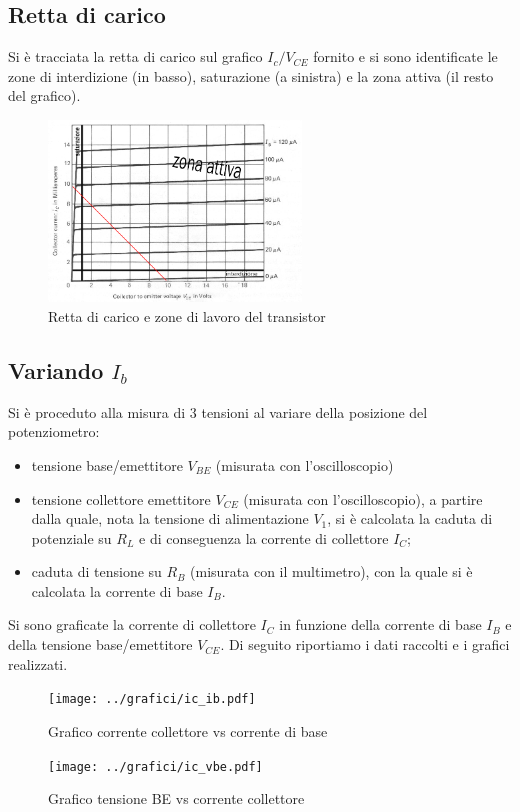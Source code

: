 \documentclass[10pt,a4paper]{article}
\begin{document}
\subsection{Retta di carico}
Si è tracciata la retta di carico sul grafico $I_c/V_{CE}$ fornito e si sono identificate le zone di interdizione (in basso), saturazione (a sinistra) e la zona attiva (il resto del grafico).
\begin{figure}[h]
	\centering
	\includegraphics[width=0.6\textwidth]{../grafici/retta_carico.png}
	\caption{Retta di carico e zone di lavoro del transistor}
	\label{retta_carico}
\end{figure}
\subsection{Variando $I_b$} %
Si è proceduto alla misura di 3 tensioni al variare della posizione del potenziometro:
\begin{itemize}
	\item tensione base/emettitore $V_{BE}$ (misurata con l'oscilloscopio)
	\item tensione collettore emettitore $V_{CE}$ (misurata con l'oscilloscopio), a partire dalla quale, nota la tensione di alimentazione $V_1$, si è calcolata la caduta di potenziale su $R_L$ e di conseguenza la corrente di collettore $I_C$;
	\item caduta di tensione su $R_B$ (misurata con il multimetro), con la quale si è calcolata la corrente di base $I_B$.
\end{itemize}
Si sono graficate la corrente di collettore $I_C$ in funzione della corrente di base $I_B$ e della tensione base/emettitore $V_{CE}$.
Di seguito riportiamo i dati raccolti e i grafici realizzati.

\begin{figure}[h!]
	\centering
	\begin{minipage}[h!]{0.4\textwidth}
		\centering
		\resizebox{1\textwidth}{!}{
			}
	\end{minipage}
	\begin{minipage}[d]{0.59\textwidth}
		\centering
		\texttt{[image: ../grafici/ic\_ib.pdf]}
		\caption{Grafico corrente collettore vs corrente di base}
		\label{ibic}
		\centering
		\texttt{[image: ../grafici/ic\_vbe.pdf]}
		\caption{Grafico tensione BE vs corrente collettore}
		\label{vbeic}
		\end{minipage}
\end{figure}
\end{document}
